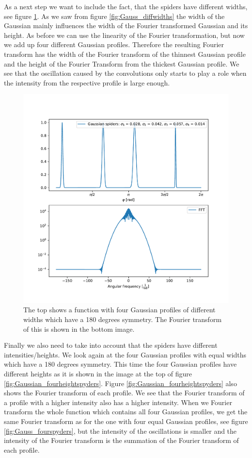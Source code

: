As a next step we want to include the fact, that the spiders have different widths, see figure \ref{fig:Gaussian_fourdiffspyders}. As we saw from figure \ref{fig:Gauss_diffwidths} the width of the Gaussian mainly influences the width of the Fourier transformed Gaussian and its height. As before we can use the linearity of the Fourier transformation, but now we add up four different Gaussian profiles. Therefore the resulting Fourier transform has the width of the Fourier transform of the thinnest Gaussian profile and the height of the Fourier Transform from the thickest Gaussian profile. We see that the oscillation caused by the convolutions only starts to play a role when the intensity from the respective profile is large enough. 
\begin{figure}[H]
	\centering
		\includegraphics[width=1.0\textwidth]{pics/Gaussian_fourdiffspyders.pdf}
		\caption{The top shows a function with four Gaussian profiles of different widths which have a 180 degrees symmetry. The Fourier transform of this is shown in the bottom image.}
		\label{fig:Gaussian_fourdiffspyders}
\end{figure} 
Finally we also need to take into account that the spiders have different intensities/heights. We look again at the four Gaussian profiles with equal widths which have a 180 degrees symmetry. This time the four Gaussian profiles have different heights as it is shown in the image at the top of figure \ref{fig:Gaussian_fourheightspyders}. Figure \ref{fig:Gaussian_fourheightspyders} also shows the Fourier transform of each profile. We see that the Fourier transform of a profile with a higher intensity also has a higher intensity. When we Fourier transform the whole function which contains all four Gaussian profiles, we get the same Fourier transform as for the one with four equal Gaussian profiles, see figure \ref{fig:Gauss_fourspyders}, but the intensity of the oscillations is smaller and the intensity of the Fourier transform is the summation of the Fourier transform of each profile. 
